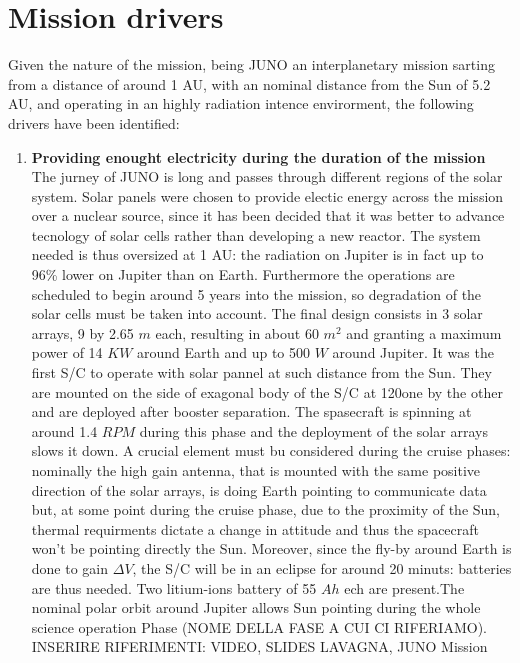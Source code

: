 \section{Mission drivers}
\label{sec:drivers}

Given the nature of the mission, being JUNO an interplanetary mission sarting from a distance of around 1 AU, with an nominal distance from the Sun of 5.2 AU, and operating in an highly radiation 
intence envirorment, the following drivers have been identified: 

\begin{enumerate}[leftmargin=1.5em]
    \item \textbf{Providing enought electricity during the duration of the mission} 
    \newline The jurney of JUNO is long and passes through different regions of the solar system. Solar panels were chosen to provide electic energy across the mission over a nuclear source, since it has been decided that it was better to advance tecnology of solar cells rather than developing a new reactor. The system needed is thus oversized at 1 AU: the radiation on Jupiter is in fact up to 96\% lower on Jupiter than on Earth. Furthermore the operations are scheduled to begin around 5 years into the mission, so degradation of the solar cells must be taken into account. The final design consists in 3 solar arrays, 9 by 2.65 $m$ each, resulting in about 60 $m^2$ and granting a maximum power of 14 $KW$ around Earth and up to 500 $W$ around Jupiter. It was the first S/C to operate with solar pannel at such distance from the Sun. They are mounted on the side of exagonal body of the S/C at 120\textdegree one by the other and are deployed after booster separation. The spasecraft is spinning at around 1.4 $RPM$ during this phase and the deployment of the solar arrays slows it down. A crucial element must bu considered during the cruise phases: nominally the high gain antenna, that is mounted with the same positive direction of the solar arrays, is doing Earth pointing to communicate data but, at some point during the cruise phase, due to the proximity of the Sun, thermal requirments dictate a change in attitude and thus the spacecraft won't be pointing directly the Sun. Moreover, since the fly-by around Earth is done to gain $\Delta V$, the S/C will be in an eclipse for around 20 minuts: batteries are thus needed. Two litium-ions battery of 55 $Ah$ ech are present.The nominal polar orbit around Jupiter allows Sun pointing during the whole science operation Phase (NOME DELLA FASE A CUI CI RIFERIAMO).              INSERIRE RIFERIMENTI: VIDEO, SLIDES LAVAGNA, JUNO Mission

\end{enumerate}
